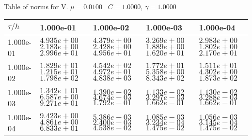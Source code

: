 \begin{center}
Table of norms for V. $\mu = 0.0100$ \, $C = 1.0000$, $\gamma = 1.0000$
  
\begin{tabular}{|p{1in}|p{1in}|p{1in}|p{1in}|p{1in}|} \hline
$\tau / h$ &1.000e-01 &1.000e-02 &1.000e-03 &1.000e-04 \\ \hline 
1.000e-01 & $4.935e+00$  $2.183e+00$  $2.996e+01$  & $4.379e+00$  $2.428e+00$  $4.956e+01$  & $3.269e+00$  $1.889e+00$  $1.620e+01$  & $2.983e+00$  $1.802e+00$  $2.170e+01$  \\ \hline 
1.000e-02 & $1.829e+01$  $1.215e+01$  $1.798e+02$  & $4.542e+02$  $4.972e+01$  $4.838e+03$  & $1.772e+01$  $5.358e+00$  $8.343e+02$  & $1.511e+01$  $4.302e+00$  $1.873e+02$  \\ \hline 
1.000e-03 & $1.342e+01$  $6.587e+00$  $9.271e+01$  & $1.390e-02$  $4.674e-03$  $1.792e-01$  & $1.133e-02$  $3.297e-03$  $1.662e-01$  & $1.130e-02$  $3.288e-03$  $1.662e-01$  \\ \hline 
1.000e-04 & $9.423e+00$  $4.861e+00$  $6.833e+01$  & $5.386e-03$  $2.400e-03$  $4.538e-02$  & $1.085e-03$  $3.234e-04$  $1.475e-02$  & $1.056e-03$  $3.145e-04$  $1.475e-02$  \\ \hline 

\end{tabular}\\[20pt]
\end{center}
